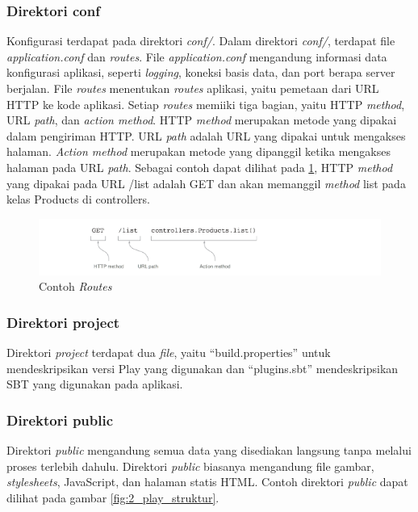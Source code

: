 \subsubsection{Direktori conf}
Konfigurasi \play terdapat pada direktori \textit{conf/}. Dalam direktori \textit{conf/}, terdapat file \textit{application.conf} dan \textit{routes}. File \textit{application.conf} mengandung informasi data konfigurasi aplikasi, seperti \textit{logging}, koneksi basis data, dan port berapa server berjalan. File \textit{routes} menentukan \textit{routes} aplikasi, yaitu pemetaan dari URL HTTP ke kode aplikasi. Setiap \textit{routes} memiiki tiga bagian, yaitu HTTP \textit{method}, URL \textit{path}, dan \textit{action method}. HTTP \textit{method} merupakan metode yang dipakai dalam pengiriman HTTP. URL \textit{path} adalah URL yang dipakai untuk mengakses halaman. \textit{Action method} merupakan metode  yang dipanggil ketika mengakses halaman pada URL \textit{path}. Sebagai contoh dapat dilihat pada \ref{fig:2_play_routes}, HTTP \textit{method} yang dipakai pada URL /list adalah GET dan akan memanggil \textit{method} list pada kelas Products di controllers.

\begin{figure}[H]
	\centering
	\includegraphics[scale=0.7]{Gambar/play-routes}
	\caption{Contoh \textit{Routes} \cite{playforjava}} 
	\label{fig:2_play_routes}
\end{figure}

\subsubsection{Direktori project}
Direktori \textit{project} terdapat dua \textit{file}, yaitu ``build.properties'' untuk mendeskripsikan versi Play yang digunakan dan ``plugins.sbt'' mendeskripsikan SBT yang digunakan pada aplikasi.

\subsubsection{Direktori public}
Direktori \textit{public} mengandung semua data yang disediakan langsung tanpa melalui proses terlebih dahulu. Direktori \textit{public} biasanya mengandung file gambar, \textit{stylesheets}, JavaScript, dan halaman statis HTML. Contoh direktori \textit{public} dapat dilihat pada gambar \ref{fig:2_play_struktur}.

